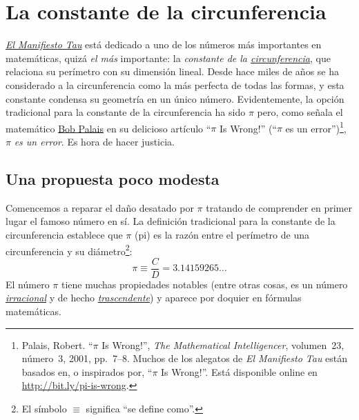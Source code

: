 
\section{La constante de la circunferencia} %
\label{sec:the_circle_constant}

\href{http://tauday.com/el-manifiesto-tau}{\emph{El Manifiesto Tau}} está dedicado a uno de los números más importantes en matemáticas, quizá \emph{el más} importante: la \emph{constante de la \href{https://es.wikipedia.org/wiki/Circunferencia}{circunferencia}}, que relaciona su perímetro con su dimensión lineal. Desde hace miles de años se ha considerado a la circunferencia como la más perfecta de todas las formas, y esta constante condensa su geometría en un único número. Evidentemente, la opción tradicional para la constante de la circunferencia ha sido $\pi$ pero, como señala el matemático \href{http://www.math.utah.edu/~palais}{Bob Palais} en su delicioso artículo ``$\pi$ Is Wrong!'' (``$\pi$ es un error'')\footnote{Palais, Robert. ``$\pi$ Is Wrong!'', \emph{The Mathematical Intelligencer}, volumen~23, número~3, 2001, pp.~7--8. Muchos de los alegatos de \emph{El Manifiesto Tau} están basados en, o inspirados por, ``$\pi$ Is Wrong!''. Está disponible online en \href{http://www.math.utah.edu/~palais/pi.html}{http://bit.ly/pi-is-wrong}.}, $\pi$ \emph{es un error}. Es hora de hacer justicia.

  \subsection{Una propuesta poco modesta} %
  \label{sec:an_immodest_proposal}

Comencemos a reparar el daño desatado por $\pi$ tratando de comprender en primer lugar el famoso número en sí. La definición tradicional para la constante de la circunferencia establece que $\pi$ (pi) es la razón entre el perímetro de una circunferencia y su diámetro\footnote{El símbolo $\equiv$ significa ``se define como''.}:
\begin{equation}
\label{eq:pi}
\pi \equiv \frac{C}{D} = 3.14159265\ldots
\end{equation}
El número $\pi$ tiene muchas propiedades notables (entre otras cosas, es un número \href{https://es.wikipedia.org/wiki/Número_irracional}{\emph{irracional}} y de hecho \href{https://es.wikipedia.org/wiki/Número_trascendente}{\emph{trascendente}}) y aparece por doquier en fórmulas matemáticas.

